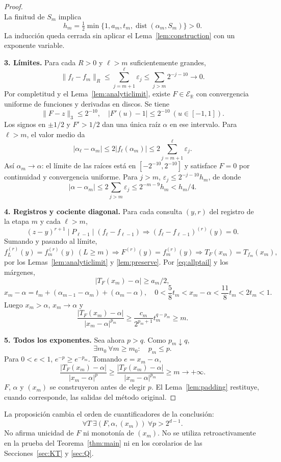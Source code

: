 \documentclass[11pt,a4paper]{article}
\numberwithin{equation}{section}
\theoremstyle{definition}
\theoremstyle{remark}
\newcommand{\R}{\mathbb R}
\newcommand{\ER}{\mathcal E_{\R}}
\DeclareMathOperator{\dist}{dist}
\newcommand{\paso}[1]{\par\smallskip\noindent\textbf{#1}\quad}
\begin{document}
\begin{proof}
\[\]
La finitud de $S_m$ implica
\[
h_m=\tfrac12\min\{1,a_m,t_m,\dist(\alpha_m,S_m)\}>0.
\]
La inducción queda cerrada sin aplicar el Lema~\ref{lem:construction} con un exponente variable.
\paso{3. Límites.}
Para cada $R>0$ y $\ell>m$ suficientemente grandes,
\[
\|f_\ell-f_m\|_R\le\sum_{j=m+1}^\ell\varepsilon_j
\le\sum_{j>m}2^{-j-10}\to0.
\]
Por completitud y el Lema~\ref{lem:analyticlimit}, existe $F\in\ER$ con convergencia uniforme de funciones y derivadas en discos. Se tiene
\[
\|F-z\|_3\le2^{-10},\quad |F'(u)-1|\le2^{-10}\ (u\in[-1,1]).
\]
Los signos en $\pm1/2$ y $F'>1/2$ dan una única raíz $\alpha$ en ese intervalo. Para $\ell>m$, el valor medio da
\[
|\alpha_\ell-\alpha_m|\le2|f_\ell(\alpha_m)|
\le2\sum_{j=m+1}^\ell\varepsilon_j.
\]
Así $\alpha_m\to\alpha$: el límite de las raíces está en $[-2^{-10},2^{-10}]$ y satisface $F=0$ por continuidad y convergencia uniforme. Para $j>m$, $\varepsilon_j\le2^{-j-10}h_m$, de donde
\begin{equation}\label{eq:allptail}
|\alpha-\alpha_m|\le2\sum_{j>m}\varepsilon_j
\le2^{-m-9}h_m<h_m/4.
\end{equation}
\paso{4. Registros y cociente diagonal.}
Para cada consulta $(y,r)$ del registro de la etapa $m$ y cada $\ell>m$,
\[
(z-y)^{r+1}\mid P_{\ell-1}\mid(f_\ell-f_{\ell-1})
\Longrightarrow(f_\ell-f_{\ell-1})^{(r)}(y)=0.
\]
Sumando y pasando al límite,
\[
f_L^{(r)}(y)=f_m^{(r)}(y)\ (L\ge m)
\Longrightarrow F^{(r)}(y)=f_m^{(r)}(y)
\Longrightarrow T_F(x_m)=T_{f_m}(x_m),
\]
por los Lemas~\ref{lem:analyticlimit} y \ref{lem:preserve}. Por \eqref{eq:allptail} y los márgenes,
\[
|T_F(x_m)-\alpha|\ge a_m/2,
\]
\[
x_m-\alpha=t_m+(\alpha_{m-1}-\alpha_m)+(\alpha_m-\alpha),
\quad0<\frac58t_m<x_m-\alpha<\frac{11}{8}t_m<2t_m<1.
\]
Luego $x_m>\alpha$, $x_m\to\alpha$ y
\begin{equation}\label{eq:allpdiag}
\frac{|T_F(x_m)-\alpha|}{|x_m-\alpha|^{p_m}}
\ge\frac{c_m}{2^{p_m+1}}t_m^{q-p_m}\ge m.
\end{equation}
\paso{5. Todos los exponentes.}
Sea ahora $p>q$. Como $p_m\downarrow q$,
\[
\exists m_0\ \forall m\ge m_0:\quad p_m\le p.
\]
Para $0<e<1$, $e^{-p}\ge e^{-p_m}$. Tomando $e=x_m-\alpha$,
\[
\frac{|T_F(x_m)-\alpha|}{|x_m-\alpha|^p}
\ge\frac{|T_F(x_m)-\alpha|}{|x_m-\alpha|^{p_m}}\ge m\to+\infty.
\]
$F$, $\alpha$ y $(x_m)$ se construyeron antes de elegir $p$. El Lema~\ref{lem:padding} restituye, cuando corresponde, las salidas del método original.
\end{proof}

La proposición cambia el orden de cuantificadores de la conclusión:
\[
\forall T\ \exists(F,\alpha,(x_m))\ \forall p>2^{d-1}.
\]
No afirma unicidad de $F$ ni monotonía de $(x_m)$. No se utiliza retroactivamente en la prueba del Teorema~\ref{thm:main} ni en los corolarios de las Secciones~\ref{sec:KT} y \ref{sec:Q}.
\end{document}
